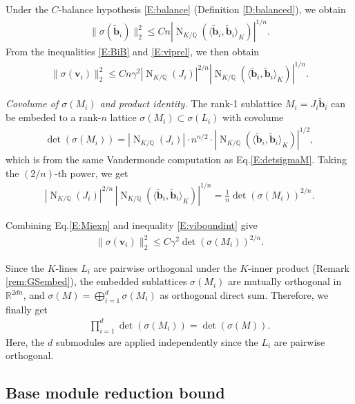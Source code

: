 \documentclass[11pt,a4paper]{article}
\theoremstyle{plain}
\theoremstyle{definition}
\theoremstyle{remark}
\DeclareMathOperator{\Nm}{N}
\newcommand{\Q}{\mathbb{Q}}
\newcommand{\R}{\mathbb{R}}
\begin{document}
Under the $C$-balance hypothesis \eqref{E:balance} (Definition \ref{D:balanced}), we obtain 
\begin{align}
  \|\sigma(\tilde{\mathbf{b}}_i)\|_2^2
  \le C n |\Nm_{K/\Q}(\langle\tilde{\mathbf{b}}_i, \tilde{\mathbf{b}}_i\rangle_K)|^{1/n}.
  \label{E:BiB}
\end{align}
From the inequalities \eqref{E:BiB} and \eqref{E:viprel}, we then obtain 
\begin{align}
  \|\sigma(\mathbf{v}_i)\|_2^2 \le
  C n \gamma^2 |\Nm_{K/\Q}(J_i)|^{2/n} |\Nm_{K/\Q}(\langle\tilde{\mathbf{b}}_i, \tilde{\mathbf{b}}_i\rangle_K)|^{1/n}.
  \label{E:viboundint}
\end{align}

\bigskip
\noindent\textit{Covolume of $\sigma(M_i)$ and product identity.} The rank-1 sublattice $M_i=J_i\tilde{\mathbf{b}}_i$ can be embeded to a rank-$n$ lattice $\sigma(M_i)\subset\sigma(L_i)$ with covolume
\begin{align}
  \det(\sigma(M_i))=|\Nm_{K/\Q}(J_i)|\cdot
  n^{n/2}\cdot|\Nm_{K/\Q}(\langle\tilde{\mathbf{b}}_i,\tilde{\mathbf{b}}_i\rangle_K)|^{1/2},
  \label{E:covolMi}
\end{align}
which is from the same Vandermonde computation as Eq.\eqref{E:detsigmaM}. Taking the $(2/n)$-th power, we get 
\begin{align}
  |\Nm_{K/\Q}(J_i)|^{2/n}\, |\Nm_{K/\Q}(\langle\tilde{\mathbf{b}}_i, \tilde{\mathbf{b}}_i\rangle_K)|^{1/n}=\frac{1}{n}\det(\sigma(M_i))^{2/n}.
  \label{E:Miexp}
\end{align}

Combining Eq.\eqref{E:Miexp} and inequality \eqref{E:viboundint} give 
\begin{align}
  \|\sigma(\mathbf{v}_i)\|_2^2 \le
  C\gamma^2\det(\sigma(M_i))^{2/n}.
  \label{E:vibound}
\end{align}

Since the $K$-lines $L_i$ are pairwise orthogonal under the $K$-inner product (Remark \ref{rem:GSembed}), the embedded sublattices $\sigma(M_i)$ are mutually orthogonal in $\R^{2dn}$, and $\sigma(M)=\bigoplus_{i=1}^d\sigma(M_i)$ as orthogonal direct sum. Therefore, we finally get 
\begin{align}
  \prod_{i=1}^d \det(\sigma(M_i))=\det(\sigma(M)).
  \label{E:Miprod}
\end{align}
Here, the $d$ submodules are applied independently since the $L_i$ are pairwise orthogonal.

\subsection{Base module reduction bound}
\end{document}
